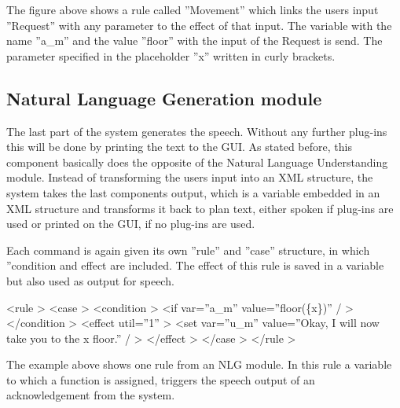 The figure above shows  a rule called ”Movement” which links the users input ”Request” with any parameter to the effect of that input.
The variable with the name ”a\_m” and the value ”floor” with the input of the Request is send.
The parameter specified in the placeholder ”x” written in curly brackets.

\subsection{Natural Language Generation module}

The last part of the system generates the speech. 
Without any further plug-ins this will be done by printing the text to the GUI.
As stated before, this component basically does the opposite of the Natural Language Understanding module. 
Instead of transforming the users input into an XML structure, the system takes the last components output, which is a variable embedded in an XML structure and transforms it back to plan text, either spoken if plug-ins are used or printed on the GUI, if no plug-ins are used. \newline

Each command is again given its own ”rule” and ”case” structure, in which ”condition and effect are included. 
The effect of this rule is saved in a variable but also used as output for speech. \newline

\textless rule \textgreater \newline
\indent \indent \textless case \textgreater \newline
\indent \indent \indent \textless condition \textgreater \newline 
\indent \indent \indent \indent \textless if var=”a\_m” value=”floor(\{x\})” / \textgreater \newline
\indent \indent \indent \textless /condition \textgreater \newline
\indent \indent \indent \textless effect util=”1” \textgreater \newline 
\indent \indent \indent \indent \textless set var=”u\_m” value=”Okay, I will now take you to the {x} floor.” / \textgreater \newline
\indent \indent \indent \textless /effect \textgreater \newline
\indent \indent\textless /case \textgreater \newline
\indent \textless /rule \textgreater \newline

The example above shows one rule from an NLG module. 
In this rule a variable to which a function  is assigned, triggers the speech output of an acknowledgement from the system.

